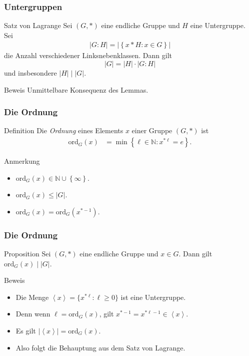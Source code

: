 \documentclass{beamer}
\renewcommand{\emph}[1]{{\textcolor{solarizedRed}{\itshape #1}}}
\newcommand\NN{\mathbb N}
\newcommand{\ord}{\mathrm{ord}}
\newcommand{\abs}[1]{\left|#1\right|}
\newcommand\cbc[1]{\left\{{#1}\right\}}
\newcommand{\bck}[1]{\left\langle{#1}\right\rangle}
\begin{document}
\begin{frame}\frametitle{Untergruppen}
	\begin{block}{Satz von Lagrange}
		Sei $(G,*)$ eine endliche Gruppe und $H$ eine Untergruppe.
		Sei
		\begin{align*}
			|G:H|=\abs{\cbc{x*H:x\in G}}
		\end{align*}
		die Anzahl verschiedener Linksnebenklassen.
		Dann gilt $$|G|=|H|\cdot|G:H|$$ und insbesondere $|H|\mid|G|$.
	\end{block}
	\begin{block}{Beweis}
		Unmittelbare Konsequenz des Lemmas.
	\end{block}
\end{frame}

\begin{frame}\frametitle{Die Ordnung}
	\begin{block}{Definition}
		Die \emph{Ordnung} eines Elements $x$ einer Gruppe $(G,*)$ ist
		\begin{align*}
			\ord_G(x)&=\min\cbc{\ell\in\NN:x^{*\ell}=e}.
		\end{align*}
	\end{block}
	\begin{block}{Anmerkung}
		\begin{itemize}
			\item $\ord_G(x)\in\NN\cup\cbc\infty$.
			\item $\ord_G(x)\leq|G|$.
			\item $\ord_G(x)=\ord_G(x^{*-1})$.
		\end{itemize}
	\end{block}
\end{frame}

\begin{frame}\frametitle{Die Ordnung}
	\begin{block}{Proposition}
		Sei $(G,*)$ eine endliche Gruppe und $x\in G$.
		Dann gilt $\ord_G(x)\mid|G|$.
	\end{block}
	\begin{block}{Beweis}
		\begin{itemize}
			\item Die Menge $\bck x=\{x^{*\ell}:\ell\geq0\}$ ist eine Untergruppe.
			\item Denn wenn $\ell=\ord_G(x)$, gilt $x^{*-1}=x^{*\ell-1}\in\bck x$.
			\item Es gilt $|\bck x|=\ord_G(x)$.
			\item Also folgt die Behauptung aus dem Satz von Lagrange.
		\end{itemize}
	\end{block}
\end{frame}
\end{document}
